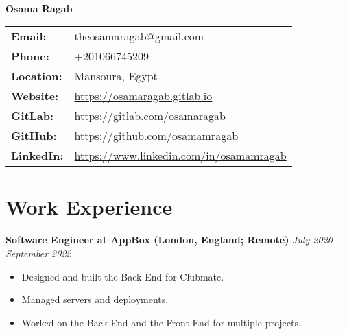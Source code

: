 \documentclass[a4paper]{article}
\newcommand{\hr}{\vspace{10pt}\noindent\hrulefill}
\newcommand{\headerdate}[2]{\textbf{#1} \hfill \textit{\footnotesize{#2}}}
\begin{document}
\begin{center}
	\vspace{2ex} \\
	\textbf{\huge{Osama Ragab}}
\end{center}

\begin{center}
	\vspace{2ex}
    \begin{tabular}{p{3cm}p{12cm}}
				\textbf{Email:} & theosamaragab@gmail.com \\
        \textbf{Phone:} & +201066745209 \\
				\textbf{Location:} & Mansoura, Egypt \\
				\textbf{Website:} & \url{https://osamaragab.gitlab.io} \\
				\textbf{GitLab:} & \url{https://gitlab.com/osamaragab} \\
				\textbf{GitHub:} & \url{https://github.com/osamamragab} \\
				\textbf{LinkedIn:} & \url{https://www.linkedin.com/in/osamamragab} \\
    \end{tabular}
\end{center}


\hr

\section*{Work Experience}

\headerdate
	{Software Engineer at AppBox (London, England; Remote)}
	{July 2020 -- September 2022}
\begin{itemize}
	\item Designed and built the Back-End for Clubmate.
	\item Managed servers and deployments.
	\item Worked on the Back-End and the Front-End for multiple projects.
\end{itemize}

\hr
\end{document}
